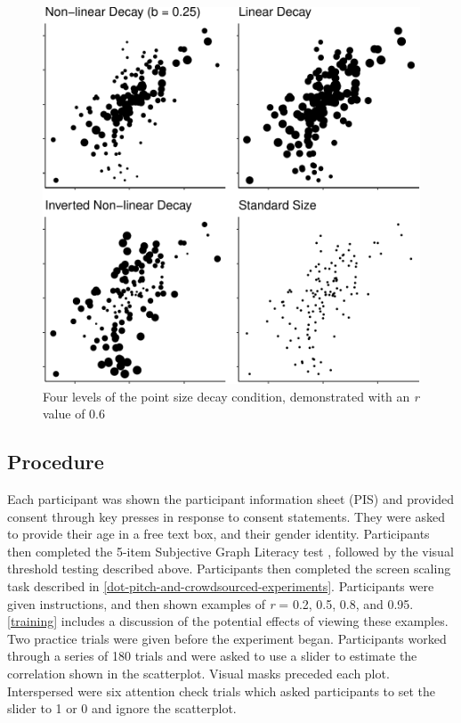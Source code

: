 \documentclass{vgtc}                          %
\begin{document}
\begin{figure}
\includegraphics[width=1\linewidth]{size_and_scatterplots_files/figure-latex/examples-1} \caption{Four levels of the point size decay condition, demonstrated with an \textit{r} value of 0.6}\label{fig:examples}
\end{figure}

\hypertarget{procedure}{%
\subsection{Procedure}\label{procedure}}

Each participant was shown the participant information sheet (PIS) and provided
consent through key presses in response to consent statements. They were asked
to provide their age in a free text box, and their gender identity. Participants
then completed the 5-item Subjective Graph Literacy test \cite{garcia_2016},
followed by the visual threshold testing described above. Participants then completed
the screen scaling task described in \autoref{dot-pitch-and-crowdsourced-experiments}.
Participants were given instructions, and then shown examples of \emph{r} = 0.2, 0.5, 0.8, and
0.95. \autoref{training} includes a discussion of the potential effects of viewing these examples. Two practice trials were given before the experiment began. Participants worked through a series of 180 trials
and were asked to use a slider to estimate the correlation shown in
the scatterplot. Visual masks preceded each plot. Interspersed were six attention check trials which asked
participants to set the slider to 1 or 0 and ignore the scatterplot.
\end{document}
